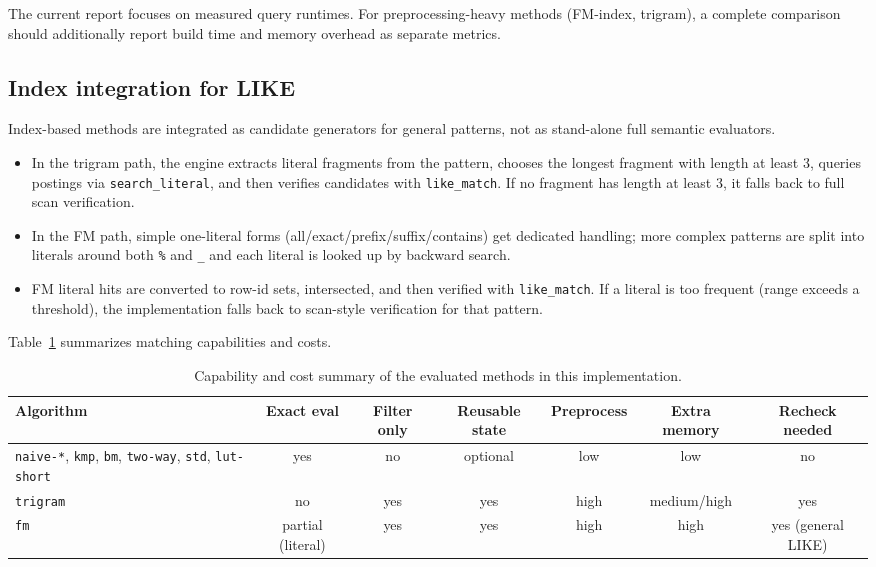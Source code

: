 \documentclass[11pt]{article}
\begin{document}
The current report focuses on measured query runtimes. For preprocessing-heavy methods (FM-index, trigram), a complete comparison should additionally report build time and memory overhead as separate metrics.

\subsection{Index integration for LIKE}

Index-based methods are integrated as candidate generators for general patterns, not as stand-alone full semantic evaluators.

\begin{itemize}
    \item In the trigram path, the engine extracts literal fragments from the pattern, chooses the longest fragment with length at least 3, queries postings via \texttt{search\_literal}, and then verifies candidates with \texttt{like\_match}. If no fragment has length at least 3, it falls back to full scan verification.
    \item In the FM path, simple one-literal forms (all/exact/prefix/suffix/contains) get dedicated handling; more complex patterns are split into literals around both \texttt{\%} and \texttt{\_} and each literal is looked up by backward search.
    \item FM literal hits are converted to row-id sets, intersected, and then verified with \texttt{like\_match}. If a literal is too frequent (range exceeds a threshold), the implementation falls back to scan-style verification for that pattern.
\end{itemize}

Table~\ref{tab:capability-matrix} summarizes matching capabilities and costs.

\begin{table}[h]
\centering
\small
\begin{tabular}{@{}lcccccc@{}}
\toprule
Algorithm & Exact eval & Filter only & Reusable state & Preprocess & Extra memory & Recheck needed \\
\midrule
\texttt{naive-*}, \texttt{kmp}, \texttt{bm}, \texttt{two-way}, \texttt{std}, \texttt{lut-short} & yes & no  & optional & low  & low  & no \\
\texttt{trigram} & no  & yes & yes & high & medium/high & yes \\
\texttt{fm}      & partial (literal) & yes & yes & high & high & yes (general LIKE) \\
\bottomrule
\end{tabular}
\caption{Capability and cost summary of the evaluated methods in this implementation.}
\label{tab:capability-matrix}
\end{table}
\end{document}
